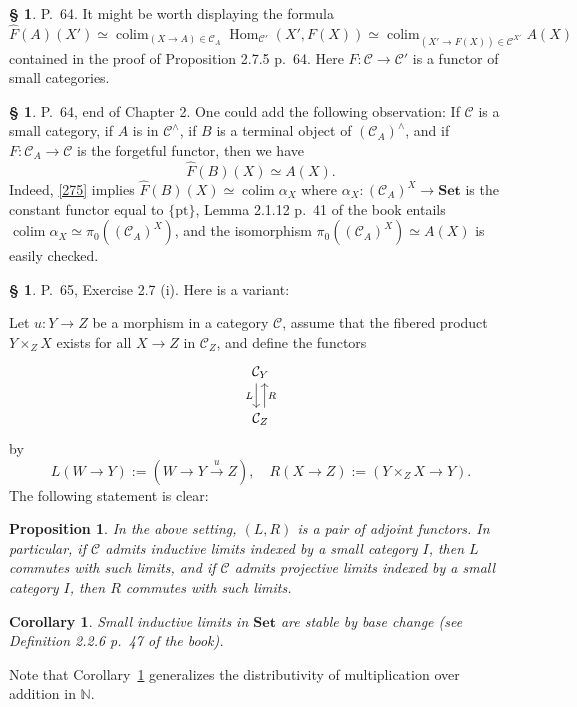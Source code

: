 \documentclass[12pt]{article}%
\newtheorem{prop}[thm]{Proposition}
\newtheorem{cor}[thm]{Corollary}
\theoremstyle{remark}
\theoremstyle{definition}
\newtheorem{s}[thm]{\S}%
\newcommand{\bb}{\mathbb}
\newcommand{\C}{\mathcal C}
\newcommand{\Set}{\mathbf{Set}}
\newcommand{\pt}{\{\text{pt}\}}
\newcommand{\xr}{\xrightarrow}
\DeclareMathOperator*{\colim}{colim}
\DeclareMathOperator{\Hom}{Hom}%
\begin{document}
%

\begin{s} 
P.~64. It might be worth displaying the formula 
\begin{equation}\label{275}
\widehat F(A)(X')\simeq\colim_{(X\to A)\in\C_A}\Hom_{\C'}(X',F(X))\simeq
\colim_{(X'\to F(X))\in\C^{X'}}A(X)
\end{equation}
contained in the proof of Proposition 2.7.5 p.~64. Here $F:\C\to\C'$ is a functor of small categories. 
\end{s}

%

\begin{s}
P.~64, end of Chapter 2. One could add the following observation:%
If $\C$ is a small category, if $A$ is in $\C^\wedge$, if $B$ is a terminal object of $(\C_A)^\wedge$, and if $F:\C_A\to\C$ is the forgetful functor, then we have 
\begin{equation}\label{1725}
\widehat F(B)(X)\simeq A(X).
\end{equation}
Indeed, \eqref{275} implies $\widehat F(B)(X)\simeq\colim\alpha_X$ where $\alpha_X:(\C_A)^X\to\Set$ is the constant functor equal to $\pt$, %
Lemma 2.1.12 p.~41 of the book entails $\colim\alpha_X\simeq\pi_0((\C_A)^X)$, and the isomorphism $\pi_0((\C_A)^X)\simeq A(X)$ is easily checked.
\end{s}

%

\begin{s}\label{bc}
P.~65, Exercise 2.7 (i). Here is a variant: 

Let $u:Y\to Z$ be a morphism in a category $\C$, assume that the fibered product $Y\times_ZX$ exists for all $X\to Z$ in $\C_Z$, and define the functors 
$$
\begin{tikzcd}
\C_Y\ar[xshift=-0.7ex]{d}[swap]{L}\\ 
\C_Z\ar[xshift=0.7ex]{u}[swap]{R}
\end{tikzcd}
$$ 
by 
$$
L(W\to Y):=(W\to Y\xr uZ),\quad R(X\to Z):=(Y\times_ZX\to Y).
$$ 
The following statement is clear:
%
\begin{prop}\label{fpa}
In the above setting, $(L,R)$ is a pair of adjoint functors. In particular, if $\C$ admits inductive limits indexed by a small category $I$, then $L$ commutes with such limits, and if $\C$ admits projective limits indexed by a small category $I$, then $R$ commutes with such limits. 
\end{prop}
%
\begin{cor}\label{sbc}
Small inductive limits in $\Set$ are stable by base change (see Definition 2.2.6 p.~47 of the book).
\end{cor}
%
Note that Corollary~\ref{sbc} generalizes the distributivity of multiplication over addition in $\bb N$.
\end{s}
\end{document}
